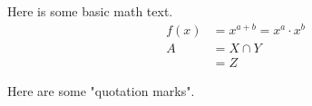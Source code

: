 \documentclass{article}
\begin{document}
Here is some basic math text.
\[
	\begin{split}
		f(x) & = x^{a+b} = x^a \cdot x^{b} \\
		A    & = X \cap Y                  \\
		     & = Z
	\end{split}
\]

Here are some "quotation marks".
\end{document}
